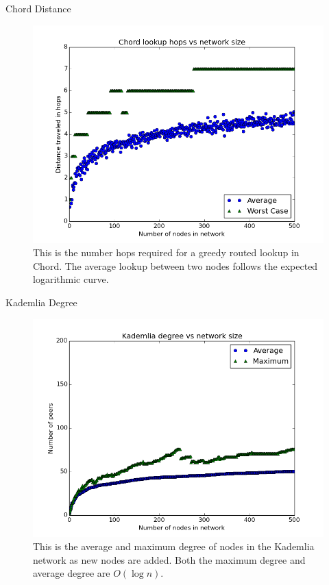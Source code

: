 \documentclass[11pt]{beamer}
\begin{document}
\begin{frame}{Chord Distance}
\begin{figure}
	\centering
	\includegraphics[width=0.7\linewidth]{figs/ChordDistance}
	\caption[Chord hops]{This is the number hops required for a greedy routed lookup in Chord. The average lookup between two nodes follows the expected logarithmic curve.}
	\label{fig:ChordDistance}
\end{figure}
\end{frame}


\begin{frame}{Kademlia Degree}
\begin{figure}
	\centering
	\includegraphics[width=0.7\linewidth]{figs/KademliaDegree}
	\caption[Degree of nodes in Kademlia]{This is the average and maximum degree of nodes in the Kademlia network as new nodes are added.  Both the maximum degree and average degree are $O(\log n)$.}
	\label{fig:KademliaDegree}
\end{figure}
\end{frame}
\end{document}
